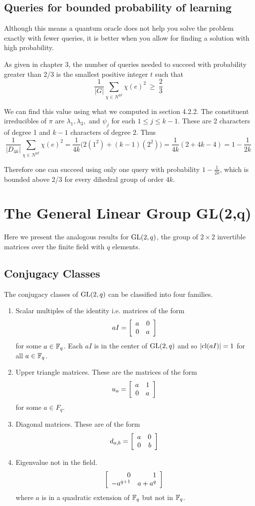 \subsection{Queries for bounded probability of learning}
Although this means a quantum oracle does not help you solve the problem exactly with fewer queries, it is better 
when you allow for finding a solution with high probability.

As given in chapter 3, the number of queries needed to succeed with probability greater than 2/3 is the smallest 
positive integer $t$ such that
\[
    \frac{1}{|G|} \sum_{\chi \in N^{\otimes t}} \chi(e)^2  \ \geq\  \frac{2}{3}
\]

We can find this value using what we computed in section 4.2.2.  The constituent irreducibles of $\pi$ are 
$\lambda_1, \lambda_3,$ and $\psi_j$ for each $1 \leq j \leq k-1$. These are 2 characters of degree 1 and $k-1$ 
characters of degree 2. Thus
\[
    \frac{1}{|D_{4k}|} \sum_{\chi \in N^{\otimes t}} \chi(e)^2 = \frac{1}{4k}\bigl( 2(1^2) + (k-1)(2^2) \bigr) = 
    \frac{1}{4k}(2 + 4k - 4) = 1 - \frac{1}{2k}
\]

Therefore one can succeed using only one query with probability $1 - \frac{1}{2k}$, which is bounded above 2/3 for 
every dihedral group of order $4k$.

\section{The General Linear Group GL(2,q)}

Here we present the analogous results for $\operatorname{GL}(2, q)$, the group of $2 \times 2$ invertible matrices over the 
finite field with $q$ elements. 



\subsection{Conjugacy Classes}

The conjugacy classes of $\operatorname{GL}(2,q)$ can be classified into four families.
\begin{enumerate}
    \item Scalar multiples of the identity i.e. matrices of the form
        \[
           aI =  \left[\begin{array}{rr}a&0\\0&a\end{array}\right]
        \]
        for some $a \in \mathbb{F}_q$. Each $aI$ is in the center of $\operatorname{GL}(2,q)$ and so $|\text{cl}(aI)| = 1$ for all $a \in 
        \mathbb{F}_q$.

    \item Upper triangle matrices. These are the matrices of the form
    \[
        u_a = \left[\begin{array}{rr}a&1\\0&a\end{array}\right]
    \]
    for some $a \in F_q$. 

\item Diagonal matrices.  These are of the form
    \[
        d_{a,b} = \left[\begin{array}{rr}a&0\\0&b\end{array}\right]
    \]
\item Eigenvalue not in the field.
    \[
        \left[\begin{array}{rr}0&1\\-a^{q+1}&a+a^q\end{array}\right]
    \]
    where $a$ is in a quadratic extension of $\mathbb{F}_q$ but not in $\mathbb{F}_q$.
\end{enumerate}


